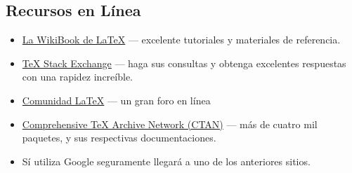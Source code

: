 \documentclass{beamer}
\begin{document}
\subsection{Recursos en Línea}
\begin{frame}{\insertsubsection}
  \begin{itemize}
  \item \href{http://en.wikibooks.org/wiki/LaTeX}{La WikiBook de
      \LaTeX{}} --- excelente tutoriales y materiales de referencia.
  \item \href{http://tex.stackexchange.com/}{\TeX{} Stack Exchange} ---
    haga sus consultas y obtenga excelentes respuestas con una rapidez
    increíble.
  \item \href{http://www.latex-community.org/}{Comunidad \LaTeX{}} ---
    un gran foro en línea
  \item \href{http://ctan.org/}{Comprehensive \TeX{} Archive Network (CTAN)} ---
    más de cuatro mil paquetes, y sus respectivas documentaciones.
  \item Sí utiliza Google seguramente llegará  a uno de los anteriores sitios.
  \end{itemize}
\end{frame}

\end{document}
